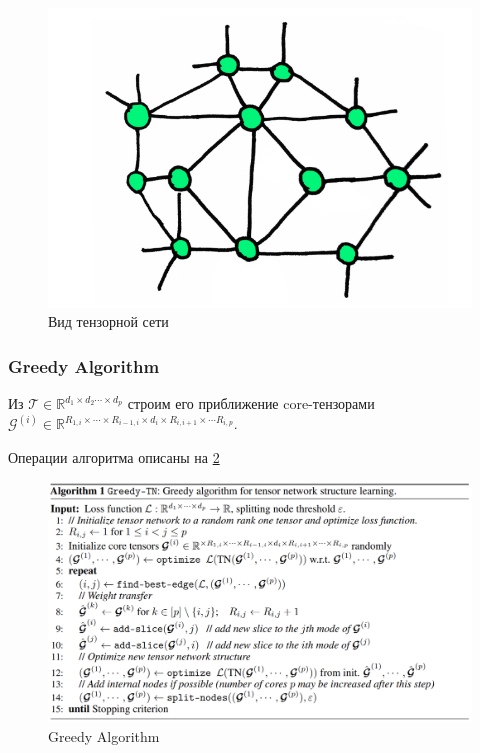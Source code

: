 \begin{figure}[h!tp]
\centering
\includegraphics[scale=0.5]{Adaptive tensor learning with tensor networks/TN.PNG}
\caption{Вид тензорной сети}
\label{fig:TensorNetExample}
\end{figure}


\subsubsection{Greedy Algorithm}
Из $\mathcal{T} \in \mathbb{R}^{d_1 \times d_2 \cdots \times d_p}$ строим его приближение core-тензорами $\mathcal{G}^{(i)} \in \mathbb{R}^{R_{1,i} \times \cdots \times R_{i-1,i} \times  d_i \times R_{i,i+1} \times \cdots R_{i,p} }$. 

Операции алгоритма описаны на \ref{fig:GreedyAlg}
\begin{figure}[h!tp]
\centering
\includegraphics[scale=0.5]{Adaptive tensor learning with tensor networks/alg.PNG}
\caption{Greedy Algorithm}
\label{fig:GreedyAlg}
\end{figure}